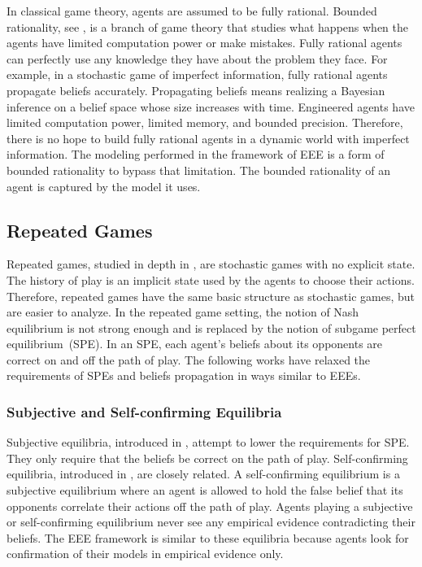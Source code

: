 In classical game theory, agents are assumed to be fully rational.
Bounded rationality, see \cite{rubinstein:1998}, is a branch of game theory that studies what happens when the agents have limited computation power or make mistakes.
Fully rational agents can perfectly use any knowledge they have about the problem they face.
For example, in a stochastic game of imperfect information, fully rational agents propagate beliefs accurately.
Propagating beliefs means realizing a Bayesian inference on a belief space whose size increases with time.
Engineered agents have limited computation power, limited memory, and bounded precision.
Therefore, there is no hope to build fully rational agents in a dynamic world with imperfect information.
The modeling performed in the framework of EEE is a form of bounded rationality to bypass that limitation.
The bounded rationality of an agent is captured by the model it uses.

\subsection{Repeated Games}
Repeated games, studied in depth in \cite{mailath_samuelson:2006}, are stochastic games with no explicit state.
The history of play is an implicit state used by the agents to choose their actions.
Therefore, repeated games have the same basic structure as stochastic games, but are easier to analyze.
In the repeated game setting, the notion of Nash equilibrium is not strong enough and is replaced by the notion of subgame perfect equilibrium~(SPE).
In an SPE, each agent's beliefs about its opponents are correct on and off the path of play.
The following works have relaxed the requirements of SPEs and beliefs propagation in ways similar to EEEs.

\subsubsection{Subjective and Self-confirming Equilibria}
Subjective equilibria, introduced in \cite{kalai_lehrer:1993:subjective}, attempt to lower the requirements for SPE.
They only require that the beliefs be correct on the path of play.
Self-confirming equilibria, introduced in \cite{fudenberg_levine:1993}, are closely related.
A self-confirming equilibrium is a subjective equilibrium where an agent is allowed to hold the false belief that its opponents correlate their actions off the path of play.
Agents playing a subjective or self-confirming equilibrium never see any empirical evidence contradicting their beliefs.
The EEE framework is similar to these equilibria because agents look for confirmation of their models in empirical evidence only.

